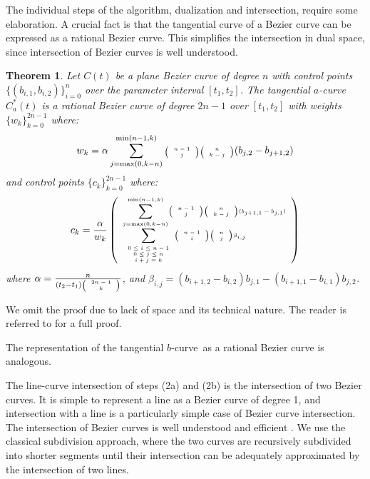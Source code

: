 \documentclass[twocolumn,10pt]{article}
\newcommand{\prf}{\noindent{{\bf Proof}:\ \ \ }}
\newcommand{\QED}{\vrule height 1.4ex width 1.0ex depth -.1ex\ \vspace{.2in}} %
\newcommand{\tinychoice}[2]{\mbox{\tiny{$\left( \begin{array}{c} #1 \\ #2 \end{array} \right)$}}}
\newcommand{\atang}{tangential $a$-curve\ }
\newcommand{\btang}{tangential $b$-curve\ }
\newtheorem{theorem}{Theorem}[section]
\begin{document}
The individual steps of the algorithm, dualization and intersection,
require some elaboration.
A crucial fact is that the tangential curve of a 
Bezier curve can be expressed as a rational Bezier curve.
This simplifies the intersection in dual space,
since intersection of Bezier curves is well understood.

\begin{theorem}
\label{thm:rationalduala}
Let $C(t)$ be a plane Bezier curve of degree $n$ 
with control points $\{ (b_{i,1}, b_{i,2}) \}_{i=0}^n$ over the parameter interval $[t_1,t_2]$.
The \atang $C_a^*(t)$ is a rational Bezier curve of degree $2n-1$ 
over $[t_1,t_2]$ with weights $\{w_k\}_{k=0}^{2n-1}$ where: 
\begin{displaymath}
\scriptsize{
w_k = \alpha
\sum_{j=\mbox{max}(0,k-n)}^{\mbox{min}(n-1,k)} 
\tinychoice{n-1}{j} \tinychoice{n}{k-j} (b_{j,2} - b_{j+1,2})
}
\end{displaymath}
%
and control points $\{c_k\}_{k=0}^{2n-1}$ where:
\begin{displaymath}
\tiny{
c_k = \frac{\alpha}{w_k} 
\left(
\begin{array}{l}
	\displaystyle{\sum_{j=\mbox{\tiny{max}}(0,k-n)}^{\mbox{\tiny{min}}(n-1,k)}}
	\tinychoice{n-1}{j} \tinychoice{n}{k-j} (b_{j+1,1} - b_{j,1})\\
	\displaystyle{\sum_{\begin{array}{c} \mbox{\tiny{$0 \leq i \leq n-1$}} \\ 
			     \mbox{\tiny{$0 \leq j \leq n$}} \\ 
			     \mbox{\tiny{$i+j=k$}}
			     \end{array}}}
\tinychoice{n-1}{i} \tinychoice{n}{j} \beta_{i,j}
\end{array}
\right)
}
\end{displaymath}
where $\alpha = \tiny{\frac{n}{(t_2 - t_1) \tinychoice{2n-1}{k}}}$,
and $\beta_{i,j} = (b_{i+1,2} - b_{i,2}) b_{j,1} - (b_{i+1,1} - b_{i,1}) b_{j,2}$.
\end{theorem}
\prf
We omit the proof due to lack of space and its technical nature.
The reader is referred to \cite{jj00} for a full proof.
\QED

The representation of the \btang as a rational Bezier curve is analogous.

The line-curve intersection of steps (2a) and (2b) is the intersection
of two Bezier curves.
It is simple to represent a line as a Bezier curve of degree 1,
and intersection with a line is a particularly simple case of Bezier
curve intersection.
The intersection of Bezier curves is well understood and efficient \cite{sederberg86}.
We use the classical subdivision approach, where the two curves are recursively
subdivided into shorter segments until their intersection can be adequately
approximated by the intersection of two lines.
\end{document}
